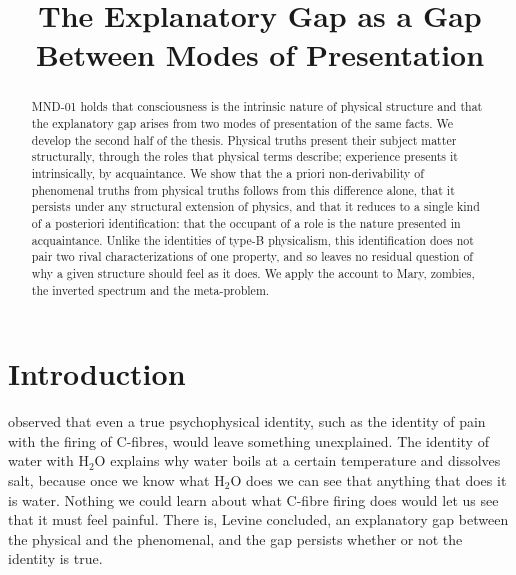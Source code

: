 \documentclass{situationist-preprint}
\title{The Explanatory Gap as a Gap Between Modes of Presentation}
\begin{document}
\maketitle

\begin{abstract}
MND-01 holds that consciousness is the intrinsic nature of physical structure and that the explanatory gap arises from two modes of presentation of the same facts. We develop the second half of the thesis. Physical truths present their subject matter structurally, through the roles that physical terms describe; experience presents it intrinsically, by acquaintance. We show that the a priori non-derivability of phenomenal truths from physical truths follows from this difference alone, that it persists under any structural extension of physics, and that it reduces to a single kind of a posteriori identification: that the occupant of a role is the nature presented in acquaintance. Unlike the identities of type-B physicalism, this identification does not pair two rival characterizations of one property, and so leaves no residual question of why a given structure should feel as it does. We apply the account to Mary, zombies, the inverted spectrum and the meta-problem.
\end{abstract}

\section{Introduction}\label{s:intro}

\citet{Levine1983} observed that even a true psychophysical identity, such as the identity of pain with the firing of C-fibres, would leave something unexplained. The identity of water with H$_2$O explains why water boils at a certain temperature and dissolves salt, because once we know what H$_2$O does we can see that anything that does it is water. Nothing we could learn about what C-fibre firing does would let us see that it must feel painful. There is, Levine concluded, an explanatory gap between the physical and the phenomenal, and the gap persists whether or not the identity is true.
\end{document}
